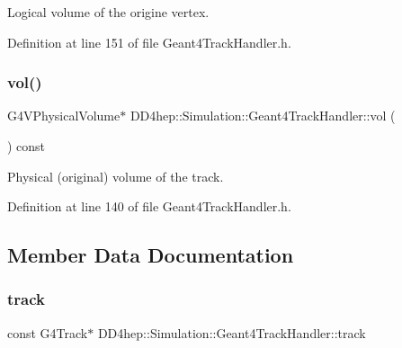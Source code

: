 Logical volume of the origine vertex. 



Definition at line 151 of file Geant4\+Track\+Handler.\+h.

\hypertarget{class_d_d4hep_1_1_simulation_1_1_geant4_track_handler_a454676baecb2ae344dcf491ba8a15090}{}\label{class_d_d4hep_1_1_simulation_1_1_geant4_track_handler_a454676baecb2ae344dcf491ba8a15090} 
\subsubsection{\texorpdfstring{vol()}{vol()}}
{\footnotesize\ttfamily G4\+V\+Physical\+Volume$\ast$ D\+D4hep\+::\+Simulation\+::\+Geant4\+Track\+Handler\+::vol (\begin{DoxyParamCaption}{ }\end{DoxyParamCaption}) const\hspace{0.3cm}{\ttfamily [inline]}}



Physical (original) volume of the track. 



Definition at line 140 of file Geant4\+Track\+Handler.\+h.



\subsection{Member Data Documentation}
\hypertarget{class_d_d4hep_1_1_simulation_1_1_geant4_track_handler_a40a5ac7eb61ca69314a64f9f3c5a0f0b}{}\label{class_d_d4hep_1_1_simulation_1_1_geant4_track_handler_a40a5ac7eb61ca69314a64f9f3c5a0f0b} 
\subsubsection{\texorpdfstring{track}{track}}
{\footnotesize\ttfamily const G4\+Track$\ast$ D\+D4hep\+::\+Simulation\+::\+Geant4\+Track\+Handler\+::track}



